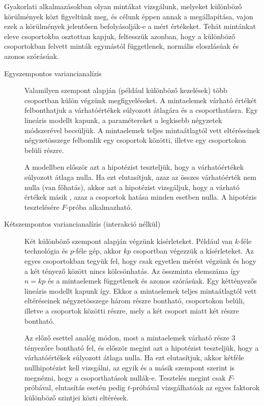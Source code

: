 \documentclass[%
	DIV=15,appendixprefix]{scrreprt}
\theoremstyle{definition}
\theoremstyle{remark}
\begin{document}
Gyakorlati alkalmazásokban olyan mintákat vizsgálunk, melyeket különböző
körülmények közt figyeltünk meg, és célunk éppen annak a megállapítása, vajon
ezek a körülmények jelentősen befolyásolják-e a mért értékeket. Tehát mintánkat
eleve csoportokba osztottan kapjuk, feltesszük azonban, hogy a különböző csoportokban felvett minták
egymástól függetlenek, normális eloszlásúak és azonos szórásúak.
\begin{description}
	\item[Egyszempontos variancianalízis] Valamilyen szempont alapján (például különböző kezelések)
		több csoportban külön végzünk megfigyeléseket. A mintaelemek várható értékét felbonthatjuk a
		várhatóértékek súlyozott átlagára és a csoporthatásra. Egy lineáris modellt kapunk, a
		paramétereket a legkisebb négyzetek módszerével becsüljük. A mintaelemek teljes
		mintaátlagtól vett eltéréseinek négyzetösszege felbomlik egy csoportok közötti, illetve egy
		csoportokon belüli részre.

		A modellben először azt a hipotézist teszteljük, hogy a várhatóértékek súlyozott átlaga
		nulla. Ha ezt elutasítjuk, azaz az összes várhatóérték nem nulla (van főhatás), akkor azt a
		hipotézist vizsgáljuk, hogy a várható értékek másik , azaz a csoportok
		hatása minden esetben nulla. A hipotézis tesztelésére $F$-próba alkalmazható.
	\item[Kétszempontos variancianalízis (interakció nélkül)] Két különböző szempont alapján
	végzünk kísérleteket. Például van $k$-féle technológia és $p$-féle gép, akkor $k p$ csoportban
	végezzük a kísérleteket. Az egyes csoportokban tegyük fel, hogy csak egyetlen mérést végzünk és
	hogy a két tényező között nincs kölcsönhatás. Az összminta elemszáma így $n=k p$ és a
	mintaelemek függetlenek és azonos szórásúak. Egy kéttényezős lineáris modellt kapunk így. Ekkor
	a mintaelemek teljes mintaátlagtól vett eltéréseinek négyzetösszege három részre bontható,
	csoportokon belüli, illetve a csoportok közötti részre, mely a két csoport miatt két részre
	bontható.

	Az előző esettel analóg módon, most a mintaelemek várható része 3 tényezőre bontható fel, és
	először megint azt a hipotézist teszteljük, hogy a várhatóértékek súlyozott átlaga nulla. Ha ezt
	elutasítjuk, akkor kétféle nullhipotézist kell vizsgálni, az egyik és a másik szempont szerint
	is megnézni, hogy a csoporthatások nullák-e. Tesztelés megint csak $F$-próbával, elutasítás
	esetén pedig $t$-próbával vizsgálhatóak az egyes faktorok különböző szintjei közti eltérések.
\end{description}
%
\end{document}
